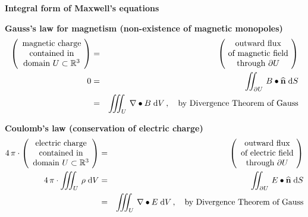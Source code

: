 
\vskip 0.5cm
\noindent
\begin{center}
\textbf{\large Integral form of Maxwell's equations}
\end{center}


\vskip 0.5cm
\noindent
\textbf{Gauss's law for magnetism (non-existence of magnetic monopoles)}
\begin{eqnarray*}
	\left(\begin{array}{c}
	\textnormal{magnetic charge}
	\\
	\textnormal{contained in}
	\\
	\textnormal{domain $U \subset \Re^{3}$}
	\end{array}\!\right)
&=&
	\left(\!\begin{array}{c}
	\textnormal{outward flux}
	\\
	\textnormal{of magnetic field}
	\\
	\textnormal{through $\partial U$}
	\end{array}\!\right)
\\
0
&=&
	\int\!\!\!\!\int_{\partial U}\, B \bullet \widehat{\mathbf{n}} \;\d S
\\
&=&
	\int\!\!\!\!\int\!\!\!\!\int_{U}\, \nabla \bullet B \;\d V\,,
	\quad
	\textnormal{by Divergence Theorem of Gauss}
\end{eqnarray*}


\vskip 0.5cm
\noindent
\textbf{Coulomb's law (conservation of electric charge)}
\begin{eqnarray*}
	4\,\pi\cdot\left(\begin{array}{c}
	\textnormal{electric charge}
	\\
	\textnormal{contained in}
	\\
	\textnormal{domain $U \subset \Re^{3}$}
	\end{array}\!\right)
&=&
	\left(\begin{array}{c}
	\textnormal{outward flux}
	\\
	\textnormal{of electric field}
	\\
	\textnormal{through $\partial U$}
	\end{array}\!\right)
\\
4\,\pi\cdot\int\!\!\!\!\int\!\!\!\!\int_{U}\, \rho \;\d V
&=&
	\int\!\!\!\!\int_{\partial U}\, E \bullet \widehat{\mathbf{n}} \;\d S
\\
&=&
	\int\!\!\!\!\int\!\!\!\!\int_{U}\, \nabla \bullet E \;\d V\,,
	\quad
	\textnormal{by Divergence Theorem of Gauss}
\end{eqnarray*}

